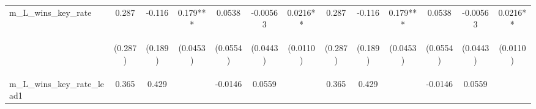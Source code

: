 \documentclass[]{article}
\begin{document}
\begin{center}
\begin{tabular}{lcccccccccccc}
m\_L\_wins\_key\_rate & 0.287 & -0.116 & 0.179*** & 0.0538 & -0.00563 & 0.0216** & 0.287 & -0.116 & 0.179*** & 0.0538 & -0.00563 & 0.0216** \\
\vspace{4pt} & \begin{footnotesize}(0.287)\end{footnotesize} & \begin{footnotesize}(0.189)\end{footnotesize} & \begin{footnotesize}(0.0453)\end{footnotesize} & \begin{footnotesize}(0.0554)\end{footnotesize} & \begin{footnotesize}(0.0443)\end{footnotesize} & \begin{footnotesize}(0.0110)\end{footnotesize} & \begin{footnotesize}(0.287)\end{footnotesize} & \begin{footnotesize}(0.189)\end{footnotesize} & \begin{footnotesize}(0.0453)\end{footnotesize} & \begin{footnotesize}(0.0554)\end{footnotesize} & \begin{footnotesize}(0.0443)\end{footnotesize} & \begin{footnotesize}(0.0110)\end{footnotesize} \\
m\_L\_wins\_key\_rate\_lead1 & 0.365 & 0.429 &  & -0.0146 & 0.0559 &  & 0.365 & 0.429 &  & -0.0146 & 0.0559 &  \\

\end{tabular}
\end{center}
\end{document}
